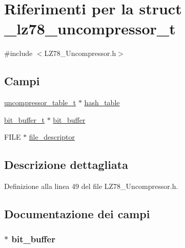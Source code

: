 \hypertarget{struct__lz78__uncompressor__t}{\section{Riferimenti per la struct \-\_\-lz78\-\_\-uncompressor\-\_\-t}
\label{struct__lz78__uncompressor__t}
}


{\ttfamily \#include $<$L\-Z78\-\_\-\-Uncompressor.\-h$>$}

\subsection*{Campi}
\begin{DoxyCompactItemize}
\item 
\hyperlink{_uncompressor__table_8h_ab0b6b9221a3fbb50deba62687be31e63}{uncompressor\-\_\-table\-\_\-t} $\ast$ \hyperlink{struct__lz78__uncompressor__t_abac9341b52ba2c7b76f924845486179f}{hash\-\_\-table}
\item 
\hyperlink{_bit__buffer__io_8h_a713e3f0b57038515d796b34e08f48fe0}{bit\-\_\-buffer\-\_\-t} $\ast$ \hyperlink{struct__lz78__uncompressor__t_ada27920eeaafe70a2886faddc0f071b1}{bit\-\_\-buffer}
\item 
F\-I\-L\-E $\ast$ \hyperlink{struct__lz78__uncompressor__t_a52a785c913c28c61f56c4aa10e3a1641}{file\-\_\-descriptor}
\end{DoxyCompactItemize}


\subsection{Descrizione dettagliata}


Definizione alla linea 49 del file L\-Z78\-\_\-\-Uncompressor.\-h.



\subsection{Documentazione dei campi}
\hypertarget{struct__lz78__uncompressor__t_ada27920eeaafe70a2886faddc0f071b1}{
\subsubsection[{bit\-\_\-buffer}]{$\ast$ bit\-\_\-buffer}}\label{struct__lz78__uncompressor__t_ada27920eeaafe70a2886faddc0f071b1}


